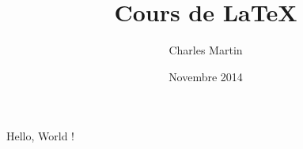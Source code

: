\documentclass{article}
\title{Cours de LaTeX}
\author{Charles Martin}
\date{Novembre 2014}
\begin{document}
Hello, World !
\end{document}
